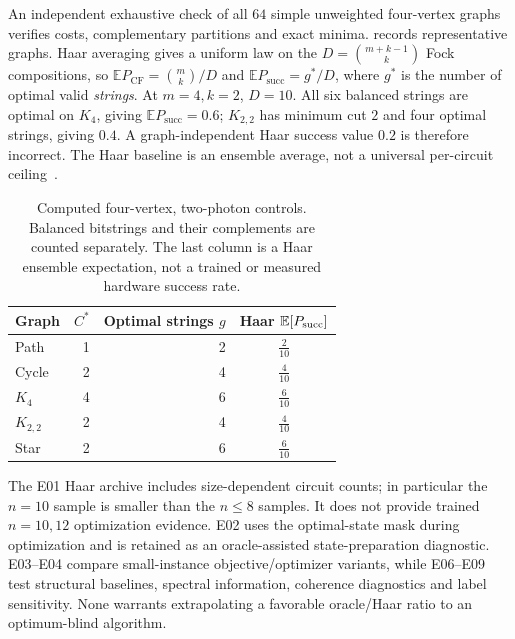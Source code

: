\documentclass[11pt,a4paper]{article}
\theoremstyle{remark}\newtheorem{remark}[theorem]{Remark}
\newcommand{\E}{\mathbb E}
\newcommand{\CF}{\mathrm{CF}}
\newcommand{\succp}{P_{\mathrm{succ}}}
\begin{document}
An independent exhaustive check of all $64$ simple unweighted four-vertex graphs verifies costs, complementary partitions and exact minima.  records representative graphs. Haar averaging gives a uniform law on the $D=\binom{m+k-1}{k}$ Fock compositions, so $\E P_{\CF}=\binom{m}{k}/D$ and $\E\succp=g^*/D$, where $g^*$ is the number of optimal valid \emph{strings}. At $m=4,k=2$, $D=10$. All six balanced strings are optimal on $K_4$, giving $\E\succp=0.6$; $K_{2,2}$ has minimum cut $2$ and four optimal strings, giving $0.4$. A graph-independent Haar success value $0.2$ is therefore incorrect. The Haar baseline is an ensemble average, not a universal per-circuit ceiling~\cite{arkhipov2012}.
\begin{table}[t]
\centering
\begin{tabular}{lrrc}
\hline
Graph & $C^*$ & Optimal strings $g$ & Haar $\mathbb{E}[P_{\rm succ}]$ \\
\hline
Path & 1 & 2 & $\frac{2}{10}$ \\
Cycle & 2 & 4 & $\frac{4}{10}$ \\
$K_4$ & 4 & 6 & $\frac{6}{10}$ \\
$K_{2,2}$ & 2 & 4 & $\frac{4}{10}$ \\
Star & 2 & 6 & $\frac{6}{10}$ \\
\hline
\end{tabular}
\caption{Computed four-vertex, two-photon controls. Balanced bitstrings and their complements are counted separately. The last column is a Haar ensemble expectation, not a trained or measured hardware success rate.}
\label{tab:graphs}
\end{table}


The E01 Haar archive includes size-dependent circuit counts; in particular the $n=10$ sample is smaller than the $n\le8$ samples. It does not provide trained $n=10,12$ optimization evidence. E02 uses the optimal-state mask during optimization and is retained as an oracle-assisted state-preparation diagnostic. E03--E04 compare small-instance objective/optimizer variants, while E06--E09 test structural baselines, spectral information, coherence diagnostics and label sensitivity. None warrants extrapolating a favorable oracle/Haar ratio to an optimum-blind algorithm.
\end{document}
